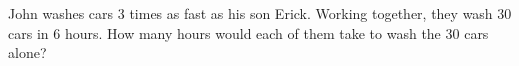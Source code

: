John washes cars $3$ times as fast as his son Erick. Working together, they wash $30$ cars in $6$ hours. How many hours would each of them take to wash the $30$ cars alone?
